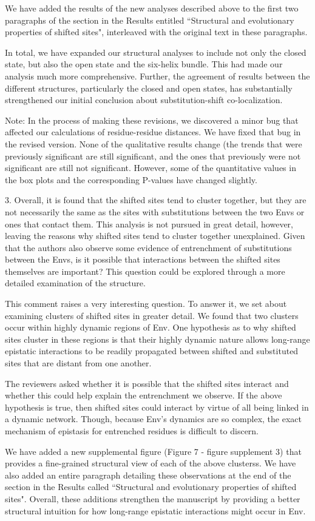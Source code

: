 \documentclass[11pt, oneside]{article}   	%
\begin{document}
{We have added the results of the new analyses described above to the first two paragraphs of the section in the Results entitled ``Structural and evolutionary properties of shifted sites", interleaved with the original text in these paragraphs.

In total, we have expanded our structural analyses to include not only the closed state, but also the open state and the six-helix bundle.
This had made our analysis much more comprehensive.
Further, the agreement of results between the different structures, particularly the closed and open states, has substantially strengthened our initial conclusion about substitution-shift co-localization.

Note: In the process of making these revisions, we discovered a minor bug that affected our calculations of residue-residue distances. We have fixed that bug in the revised version. None of the qualitative results change (the trends that were previously significant are still significant, and the ones that previously were not significant are still not significant. However, some of the quantitative values in the box plots and the corresponding P-values have changed slightly.
}

3. Overall, it is found that the shifted sites tend to cluster together, but they are not necessarily the same as the sites with substitutions between the two Envs or ones that contact them. This analysis is not pursued in great detail, however, leaving the reasons why shifted sites tend to cluster together unexplained. Given that the authors also observe some evidence of entrenchment of substitutions between the Envs, is it possible that interactions between the shifted sites themselves are important? This question could be explored through a more detailed examination of the structure. 

{\color{black}
This comment raises a very interesting question.
To answer it, we set about examining clusters of shifted sites in greater detail.
We found that two clusters occur within highly dynamic regions of Env.
One hypothesis as to why shifted sites cluster in these regions is that their highly dynamic nature allows long-range epistatic interactions to be readily propagated between shifted and substituted sites that are distant from one another.

The reviewers asked whether it is possible that the shifted sites interact and whether this could help explain the entrenchment we observe. If the above hypothesis is true, then shifted sites could interact by virtue of all being linked in a dynamic network. Though, because Env's dynamics are so complex, the exact mechanism of epistasis for entrenched residues is difficult to discern.

We have added a new supplemental figure (Figure 7 - figure supplement 3) that provides a fine-grained structural view of each of the above clusterss.
We have also added an entire paragraph detailing these observations at the end of the section in the Results called ``Structural and evolutionary properties of shifted sites".
Overall, these additions strengthen the manuscript by providing a better structural intuition for how long-range epistatic interactions might occur in Env.
}
\end{document}

